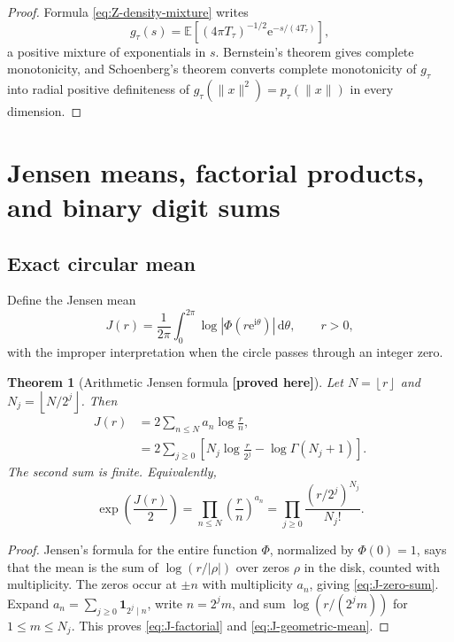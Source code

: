 \documentclass[11pt,oneside]{article}
\newtheorem{theorem}{Theorem}[section]
\theoremstyle{definition}
\theoremstyle{remark}
\newcommand{\E}{\mathbb E}
\newcommand{\e}{\mathrm e}
\newcommand{\ii}{\mathrm i}
\newcommand{\dd}{\,\mathrm d}
\newcommand{\floor}[1]{\left\lfloor #1\right\rfloor}
\newcommand{\New}{\textcolor{amber}{\textbf{[proved here]}}}
\begin{document}
\begin{proof}
Formula \eqref{eq:Z-density-mixture} writes
\[
 g_\tau(s)=\E\left[(4\pi T_\tau)^{-1/2}
                    \e^{-s/(4T_\tau)}\right],
\]
a positive mixture of exponentials in $s$.  Bernstein's theorem gives complete monotonicity,
and Schoenberg's theorem converts complete monotonicity of $g_\tau$ into radial positive
definiteness of $g_\tau(\|x\|^2)=p_\tau(\|x\|)$ in every dimension.
\end{proof}

\section{Jensen means, factorial products, and binary digit sums}
\label{sec:jensen}

\subsection{Exact circular mean}

Define the Jensen mean
\begin{equation}
 J(r)=\frac1{2\pi}\int_0^{2\pi}
 \log\left|\Phi(r\e^{\ii\theta})\right|\dd\theta,
 \qquad r>0,                                             \label{eq:J-def}
\end{equation}
with the improper interpretation when the circle passes through an integer zero.

\begin{theorem}[Arithmetic Jensen formula \New]
Let $N=\floor r$ and $N_j=\floor{N/2^j}$.  Then
\begin{align}
 J(r)
 &=2\sum_{n\le N}a_n\log\frac{r}{n},                     \label{eq:J-zero-sum}\\
 &=2\sum_{j\ge0}
 \left[N_j\log\frac{r}{2^j}-\log\Gamma(N_j+1)\right].   \label{eq:J-factorial}
\end{align}
The second sum is finite.  Equivalently,
\begin{equation}
 \boxed{\quad
 \exp\left(\frac{J(r)}2\right)
 =\prod_{n\le N}\left(\frac{r}{n}\right)^{a_n}
 =\prod_{j\ge0}\frac{(r/2^j)^{N_j}}{N_j!}.
 \quad}                                                  \label{eq:J-geometric-mean}
\end{equation}
\end{theorem}

\begin{proof}
Jensen's formula for the entire function $\Phi$, normalized by $\Phi(0)=1$, says that the
mean is the sum of $\log(r/|\rho|)$ over zeros $\rho$ in the disk, counted with multiplicity.
The zeros occur at $\pm n$ with multiplicity $a_n$, giving \eqref{eq:J-zero-sum}.  Expand
$a_n=\sum_{j\ge0}\mathbf1_{2^j\mid n}$, write $n=2^jm$, and sum
$\log(r/(2^jm))$ for $1\le m\le N_j$.  This proves \eqref{eq:J-factorial} and
\eqref{eq:J-geometric-mean}.
\end{proof}
\end{document}
